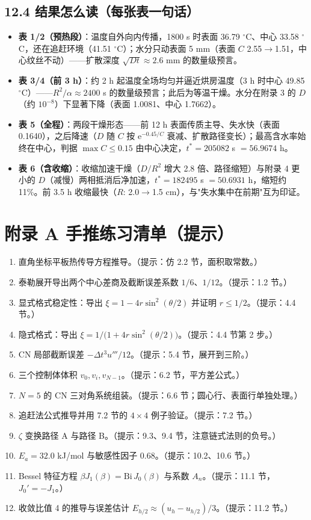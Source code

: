 \documentclass[12pt,a4paper]{ctexart}
\begin{document}
\subsection{12.4 结果怎么读（每张表一句话）}

\begin{itemize}[leftmargin=2em]
\item \textbf{表 1/2（预热段）}：温度自外向内传播，1800 s 时表面 36.79 $^\circ$C、中心 33.58 $^\circ$C，还在追赶环境（41.51 $^\circ$C）；水分只动表面 5 mm（表面 $C$ 2.55$\to$1.51，中心纹丝不动）——扩散深度 $\sqrt{Dt}\approx2.6$ mm 的数量级预言。
\item \textbf{表 3/4（前 3 h）}：约 2 h 起温度全场均匀并逼近烘房温度（3 h 时中心 49.85 $^\circ$C）——$R^2/\alpha\approx2400$ s 的数量级预言；此后为等温干燥。水分在附录 3 的 $D$（约 $10^{-8}$）下显著下降（表面 1.0081、中心 1.7662）。
\item \textbf{表 5（全程）}：两段干燥形态——前 12 h 表面传质主导、失水快（表面 0.1640），之后降速（$D$ 随 $C$ 按 $\mathrm{e}^{-0.45/C}$ 衰减、扩散路径变长）；最高含水率始终在中心，判据 $\max C\le0.15$ 由中心决定，$t^*=205082$ s $=56.9674$ h。
\item \textbf{表 6（含收缩）}：收缩加速干燥（$D/R^2$ 增大 2.8 倍、路径缩短）与附录 4 更小的 $D$（减慢）两相抵消后净加速，$t^*=182495$ s $=50.6931$ h，缩短约 11\%。前 3.5 h 收缩最快（$R$: 2.0$\to$1.5 cm），与"失水集中在前期"互为印证。
\end{itemize}

\section{附录 A 手推练习清单（提示）}

\begin{enumerate}[leftmargin=2em]
\item 直角坐标平板热传导方程推导。（提示：仿 2.2 节，面积取常数。）
\item 泰勒展开导出两个中心差商及截断误差系数 $1/6$、$1/12$。（提示：1.2 节。）
\item 显式格式稳定性：导出 $\xi=1-4r\sin^2(\theta/2)$ 并证明 $r\le1/2$。（提示：4.4 节。）
\item 隐式格式：导出 $\xi=1/\bigl(1+4r\sin^2(\theta/2)\bigr)$。（提示：4.4 节第 2 步。）
\item CN 局部截断误差 $-\Delta t^3u'''/12$。（提示：5.4 节，展开到三阶。）
\item 三个控制体体积 $v_0,v_i,v_{N-1}$。（提示：6.2 节，平方差公式。）
\item $N=5$ 的 CN 三对角系统组装。（提示：6.6 节；圆心行、表面行单独处理。）
\item 追赶法公式推导并用 7.2 节的 $4\times4$ 例子验证。（提示：7.2 节。）
\item $\zeta$ 变换路径 A 与路径 B。（提示：9.3、9.4 节，注意链式法则的负号。）
\item $E_a=32.0$ kJ/mol 与敏感性因子 0.68。（提示：10.2、10.6 节。）
\item Bessel 特征方程 $\beta J_1(\beta)=\mathrm{Bi}\,J_0(\beta)$ 与系数 $A_n$。（提示：11.1 节，$J_0'=-J_1$。）
\item 收敛比值 4 的推导与误差估计 $E_{h/2}\approx(u_h-u_{h/2})/3$。（提示：11.2 节。）
\end{enumerate}
\end{document}
